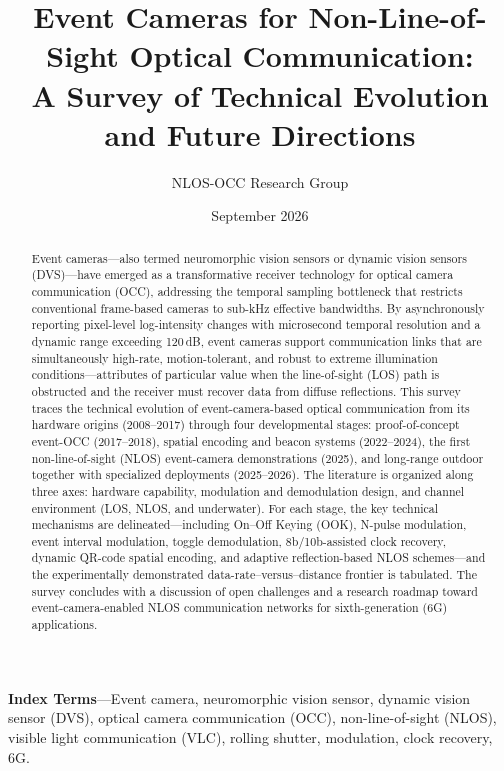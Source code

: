 \documentclass[10pt,a4paper]{article}
\title{Event Cameras for Non-Line-of-Sight Optical Communication: \\
       A Survey of Technical Evolution and Future Directions}
\author{
  NLOS-OCC Research Group
}
\date{September 2026}
\begin{document}
\maketitle

\begin{abstract}
Event cameras---also termed neuromorphic vision sensors or dynamic vision
sensors (DVS)---have emerged as a transformative receiver technology for
optical camera communication (OCC), addressing the temporal sampling
bottleneck that restricts conventional frame-based cameras to
sub-kHz effective bandwidths. By asynchronously reporting pixel-level
log-intensity changes with microsecond temporal resolution and a dynamic
range exceeding 120\,dB, event cameras support communication links that
are simultaneously high-rate, motion-tolerant, and robust to extreme
illumination conditions---attributes of particular value when the
line-of-sight (LOS) path is obstructed and the receiver must recover
data from diffuse reflections. This survey traces the technical evolution
of event-camera-based optical communication from its hardware origins
(2008--2017) through four developmental stages: proof-of-concept
event-OCC (2017--2018), spatial encoding and beacon systems
(2022--2024), the first non-line-of-sight (NLOS) event-camera
demonstrations (2025), and long-range outdoor together with specialized
deployments (2025--2026). The literature is organized along three axes:
hardware capability, modulation and demodulation design, and channel
environment (LOS, NLOS, and underwater). For each stage, the key
technical mechanisms are delineated---including On--Off Keying (OOK),
N-pulse modulation, event interval modulation, toggle demodulation,
8b/10b-assisted clock recovery, dynamic QR-code spatial encoding, and
adaptive reflection-based NLOS schemes---and the experimentally
demonstrated data-rate--versus--distance frontier is tabulated. The
survey concludes with a discussion of open challenges and a research
roadmap toward event-camera-enabled NLOS communication networks for
sixth-generation (6G) applications.
\end{abstract}

\noindent\textbf{Index Terms}---Event camera, neuromorphic vision sensor,
dynamic vision sensor (DVS), optical camera communication (OCC),
non-line-of-sight (NLOS), visible light communication (VLC), rolling
shutter, modulation, clock recovery, 6G.

\end{document}
